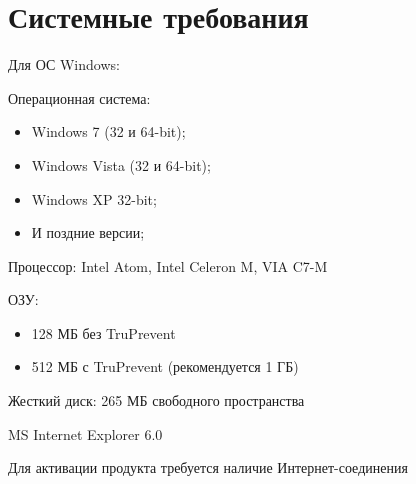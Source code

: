     \section{Системные требования}
        Для ОС Windows:\par
        Операционная система: 
        \begin{itemize}
    
            \item Windows 7 (32 и 64-bit);
            \item Windows Vista (32 и 64-bit);
            \item Windows XP 32-bit;
            \item И поздние версии;
        \end{itemize}
        Процессор: Intel Atom, Intel Celeron M, VIA C7-M\par
            ОЗУ: 
        \begin{itemize}
            \item 128 МБ без TruPrevent 
            \item 512 МБ с TruPrevent (рекомендуется 1 ГБ) 
        \end{itemize}
            Жесткий диск: 265 МБ свободного пространства\par
            MS Internet Explorer 6.0\par
            
            Для активации продукта требуется наличие Интернет-соединения

